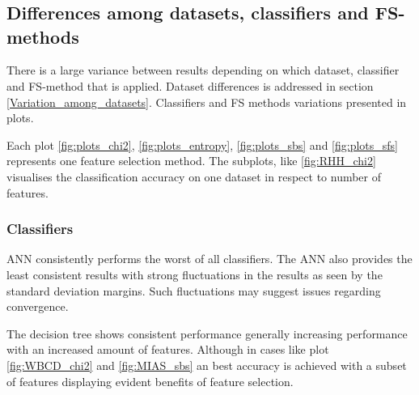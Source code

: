 \begin{table}[htbp!]
   \\
  \caption[]%
  {{\small All datasets except MIAS benefited from feature selection using CART Decision Tree classifier.}}
  \label{table:CART}
\end{table}

\begin{table}[htbp!]
   \\
  \caption[]%
  {{\small Naive Bayes sees improvement or equivalent accuracy by feature selection on every dataset.}}
  \label{table:NB}
\end{table}

\begin{table}[htbp!]
   \\
  \caption[]%
  {{\small Classification accuracy achieved by SVM was improved or equivalent on every dataset with use of feature selection.}}
  \label{table:SVM}
\end{table}


\subsection{Differences among datasets, classifiers and FS-methods}

There is a large variance between results depending on which dataset, classifier and FS-method that is applied. Dataset differences is addressed in section \ref{Variation_among_datasets}. Classifiers and FS methods variations presented in plots.

Each plot \ref{fig:plots_chi2}, \ref{fig:plots_entropy}, \ref{fig:plots_sbs} and \ref{fig:plots_sfs} represents one feature selection method. The subplots, like \ref{fig:RHH_chi2} visualises the classification accuracy on one dataset in respect to number of features.

\subsubsection{Classifiers}

ANN consistently performs the worst of all classifiers. The ANN also provides the least consistent results with strong fluctuations in the results as seen by the standard deviation margins. Such fluctuations may suggest issues regarding convergence.

The decision tree shows consistent performance generally increasing performance with an increased amount of features. Although in cases like plot \ref{fig:WBCD_chi2} and \ref{fig:MIAS_sbs} an best accuracy is achieved with a subset of features displaying evident benefits of feature selection.

